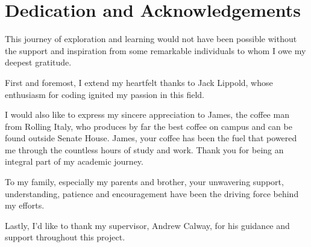 \chapter*{Dedication and Acknowledgements}
\begin{SingleSpace}
This journey of exploration and learning would not have been possible without the support and inspiration from some remarkable individuals to whom I owe my deepest gratitude.

First and foremost, I extend my heartfelt thanks to Jack Lippold, whose enthusiasm for coding ignited my passion in this field. 

I would also like to express my sincere appreciation to James, the coffee man from Rolling Italy, who produces by far the best coffee on campus and can be found outside Senate House. James, your coffee has been the fuel that powered me through the countless hours of study and work. Thank you for being an integral part of my academic journey.

To my family, especially my parents and brother, your unwavering support, understanding, patience and encouragement have been the driving force behind my efforts.

Lastly, I'd like to thank my supervisor, Andrew Calway, for his guidance and support throughout this project.
\newline    


\end{SingleSpace}
\clearpage

